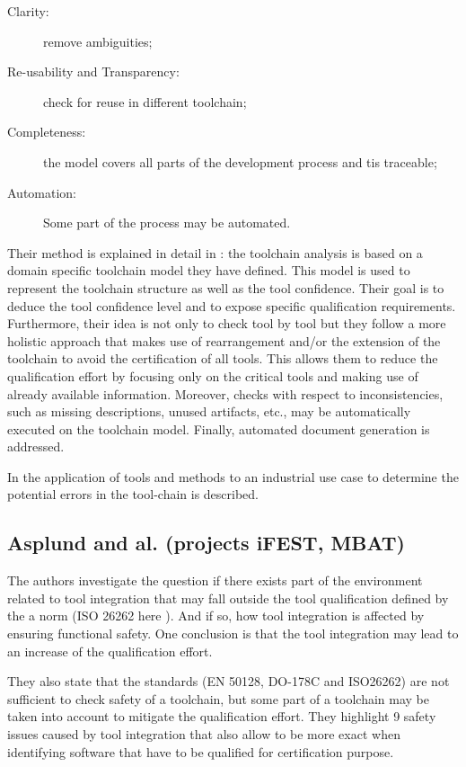 \begin{description}
\item[Clarity:] remove ambiguities;
\item[Re-usability and Transparency:] check for reuse in different toolchain;
\item[Completeness:] the model covers all parts of the  development
  process and tis traceable;
\item[Automation:] Some part of the process may be automated.
\end{description}

Their method is explained in detail in \cite{slotosch_iso_2012}: the
toolchain analysis is based on a domain specific toolchain model
they have defined. This model is used to represent the toolchain
structure as well as the tool confidence.  Their goal is to deduce the
tool confidence level and to expose specific qualification
requirements. Furthermore, their idea is not only to check tool by
tool but they follow a more holistic approach that makes use of
rearrangement and/or the extension of the toolchain to avoid the
certification of all tools. This allows them to reduce the
qualification effort by focusing only on the critical tools and making
use of already available information.  Moreover, checks with respect to inconsistencies,
such as missing descriptions, unused artifacts, etc., may be
automatically executed on the toolchain model. Finally, automated document generation is addressed.

In \cite{wildmoser_determining_2012} the application of tools and methods to an
industrial use case to determine the potential errors in the tool-chain is described.

\subsection{Asplund and al. (projects iFEST, MBAT)}
\label{sec-1-2.2}

The authors investigate the question if there exists part of the environment related to tool
integration that may fall outside the tool qualification defined by the a norm
(ISO 26262 here \cite{asplund_qualifying_2012}). And if so, how tool integration
is affected by ensuring functional safety. One conclusion is that the tool
integration may lead to an increase of the qualification effort.

They also state that the standards (EN 50128, DO-178C and ISO26262)
are not sufficient to check safety of a toolchain, but some part of a
toolchain may be taken into account to mitigate the qualification
effort. 
They highlight 9 safety issues caused by tool integration that also
allow to be more exact when identifying software that have to be
qualified for certification purpose. 

